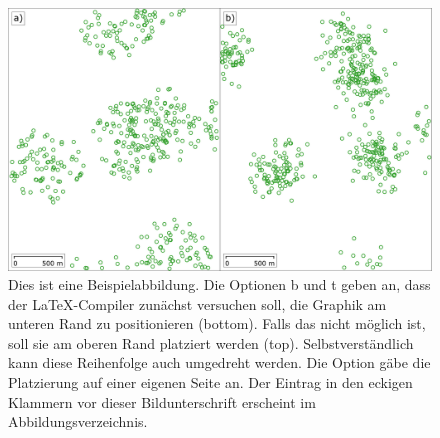 \begin{figure}[bt]
    \centering
    \includegraphics[width=\textwidth]{figures/Figure1.pdf}
    \caption[Beispielabbildung]{Dies ist eine Beispielabbildung. Die Optionen b und t geben an, dass der LaTeX-Compiler zunächst versuchen soll, die Graphik am unteren Rand zu positionieren (bottom). Falls das nicht möglich ist, soll sie am oberen Rand platziert werden (top). Selbstverständlich kann diese Reihenfolge auch umgedreht werden. Die Option gäbe die Platzierung auf einer eigenen Seite an. Der Eintrag in den eckigen Klammern vor dieser Bildunterschrift erscheint im Abbildungsverzeichnis.}
    \label{fig:1}
\end{figure}


